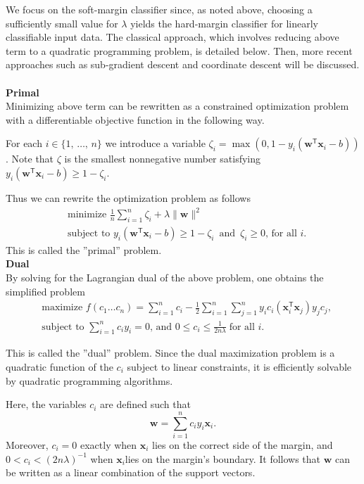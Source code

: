 We focus on the soft-margin classifier since, as noted above, choosing a sufficiently small value for \(\lambda\)  yields the hard-margin classifier for linearly classifiable input data. The classical approach, which involves reducing above term to a quadratic programming problem, is detailed below. Then, more recent approaches such as sub-gradient descent and coordinate descent will be discussed. \\
\\
\textbf{Primal} \\
Minimizing above term can be rewritten as a constrained optimization problem with a differentiable objective function in the following way.

For each \(i \in \{1,\,\ldots,\,n\}\) we introduce a variable \(\zeta_i = \max\left(0, 1 - y_i(\mathbf{w}^\mathsf{T} \mathbf{x}_i - b)\right)\). Note that \(\zeta\) is the smallest nonnegative number satisfying \(y_i(\mathbf{w}^\mathsf{T} \mathbf{x}_i - b) \geq 1 - \zeta_i.\)

Thus we can rewrite the optimization problem as follows
\begin{align}
&\text{minimize } \frac 1 n \sum_{i=1}^n \zeta_i + \lambda \|\mathbf{w}\|^2 \\[0.5ex]
&\text{subject to } y_i\left(\mathbf{w}^\mathsf{T} \mathbf{x}_i - b\right) \geq 1 - \zeta_i \, \text{ and } \, \zeta_i \geq 0,\, \text{for all } i.
\end{align}
This is called the ''primal'' problem.
\\

\textbf{Dual} \\
By solving for the Lagrangian dual of the above problem, one obtains the simplified problem
\begin{align}
&\text{maximize}\,\, f(c_1 \ldots c_n) =  \sum_{i=1}^n c_i - \frac 1 2 \sum_{i=1}^n\sum_{j=1}^n y_i c_i(\mathbf{x}_i^\mathsf{T} \mathbf{x}_j)y_j c_j, \\
&\text{subject to } \sum_{i=1}^n c_iy_i = 0,\,\text{and } 0 \leq c_i \leq \frac{1}{2n\lambda}\;\text{for all }i.
\end{align}

This is called the ''dual'' problem. Since the dual maximization problem is a quadratic function of the \(c_i\) subject to linear constraints, it is efficiently solvable by quadratic programming algorithms.

Here, the variables \(c_i\) are defined such that
\[\mathbf{w} = \sum_{i=1}^n c_iy_i \mathbf{x}_i.\]
Moreover, \(c_i = 0\) exactly when \(\mathbf{x}_i\) lies on the correct side of the margin, and \(0 < c_i <(2n\lambda)^{-1}\) when \(\mathbf{x}_i\)lies on the margin's boundary. It follows that \(\mathbf{w}\) can be written as a linear combination of the support vectors.

